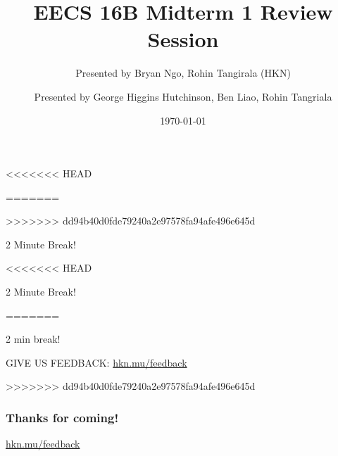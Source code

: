 

\title{EECS 16B Midterm 1 Review Session}
<<<<<<< HEAD
\author{Presented by Bryan Ngo, Rohin Tangirala (HKN)}
\date{}

\newcommand{\SlideAccessingLogistics}{@1046}
=======
\author{Presented by George Higgins Hutchinson, Ben Liao, Rohin Tangriala}
\date{\today}

\newcommand{\SlideAccessingLogistics}{\@691}
>>>>>>> dd94b40d0fde79240a2e97578fa94afe496e645d










\begin{frame}
    2 Minute Break!
\end{frame}



<<<<<<< HEAD

\begin{frame}
	2 Minute Break!
\end{frame}

=======
	\begin{frame}
	    2 min break!

        GIVE US FEEDBACK: \url{hkn.mu/feedback}
	\end{frame}
>>>>>>> dd94b40d0fde79240a2e97578fa94afe496e645d






\begin{frame}
    \frametitle{Thanks for coming!}
    \href{https://hkn.mu/feedback}{hkn.mu/feedback}
\end{frame}


